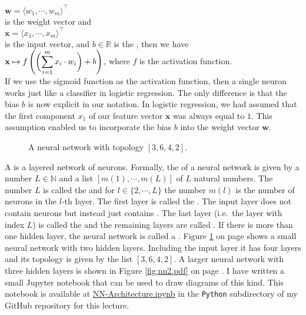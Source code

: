 \hspace*{1.3cm}
$\mathbf{w} = \langle w_1, \cdots, w_m \rangle^\top$ 
\\[0.2cm]
is the weight vector and 
\\[0.2cm]
\hspace*{1.3cm}
$\mathbf{x} = \langle x_1, \cdots, x_m \rangle^\top$
\\[0.2cm]
is the input vector, and $b\in \mathbb{R}$ is the ,  then we have
\\[0.2cm]
\hspace*{1.3cm}
$\displaystyle \mathbf{x} \mapsto f\left(\biggl(\sum\limits_{i=1}^m x_i \cdot w_i\biggr) + b\right)$, \quad where $f$ is
the activation function.
\\[0.2cm]
If we use the sigmoid function as the activation function, then 
a single neuron works just like a classifier in logistic regression.  The only difference is that the bias $b$
is now explicit in our notation.  In logistic regression, we had assumed that the first component $x_1$ of our
feature vector $\mathbf{x}$ was always equal to $1$.  This assumption enabled us to incorporate the bias $b$ into the
weight vector $\mathbf{w}$.

\begin{figure}[!h]
  \centering
  \vspace*{-2cm}
    \vspace*{-2cm}
   \caption{A neural network with topology $[3, 6, 4, 2]$.}
  \label{fig:nn1.pdf}
\end{figure}

A   is a layered network of neurons.
Formally, the   of a neural network is 
given by a number $L \in \mathbb{N}$ and a list $[m(1), \cdots, m(L)]$ of $L$ natural numbers.  The number
$L$ is called the   and for $l \in \{2,\cdots,L\}$ the number $m(l)$ is the number of
neurons in the $l$-th layer.  The first layer is called the . 
The input layer does not contain neurons but instead just contains .  The
last layer (i.e.~the layer with index $L$) is called the   and the
remaining layers are called .   If there is more than one hidden layer,
the neural network is called a .  Figure \ref{fig:nn1.pdf}
on page \pageref{fig:nn1.pdf} shows a small neural network with two hidden layers.  Including the input layer
it has four layers and its topology is given by the list $[3, 6, 4, 2]$.  A larger neural network with three
hidden layers is shown in Figure \ref{fig:nn2.pdf} on page \pageref{fig:nn2.pdf}.  I have written a small
Jupyter notebook that can be used to draw diagrams of this kind. This notebook is available at
\href{https://github.com/karlstroetmann/Artificial-Intelligence/blob/master/Python/7%20Neural%20Networks/NN-Architecture.ipynb}{NN-Architecture.ipynb}
in the \texttt{Python} subdirectory of my GitHub repository for this lecture. 


